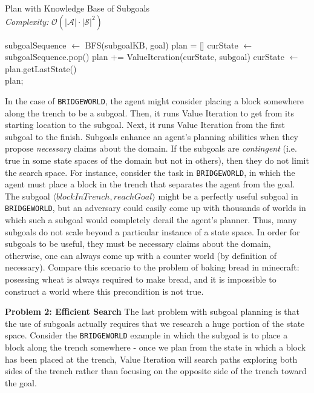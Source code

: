 \documentclass[]{article}
\begin{document}
\begin{algorithm}
  \caption{Plan with Knowledge Base of Subgoals \\ {\it Complexity:} $\mathcal{O}(|\mathcal{A}|\cdot |\mathcal{S}|^2)$}
  \begin{algorithmic}[1]
    \State subgoalSequence $\gets$ BFS(subgoalKB, goal)
    \State plan = []
    \State curState $\gets$ subgoalSequence.pop()
    		\State plan += ValueIteration(curState, subgoal)
		\State curState $\gets$ plan.getLastState()
    \EndFor \\
    \Return plan;
  \end{algorithmic}
\end{algorithm}

In the case of \texttt{BRIDGEWORLD}, the agent might consider placing
a block somewhere along the trench to be a subgoal. Then, it runs
Value Iteration to get from its starting location to the subgoal.
Next, it runs Value Iteration from the first subgoal to the finish.
Subgoals enhance an agent's planning abilities when they propose {\it
  necessary} claims about the domain. If the subgoals are {\it
  contingent} (i.e. true in some state spaces of the domain but not in
others), then they do not limit the search space. For instance,
consider the task in \texttt{BRIDGEWORLD}, in which the agent must
place a block in the trench that separates the agent from the goal.
The subgoal $\langle blockInTrench, reachGoal\rangle$ might be a
perfectly useful subgoal in \texttt{BRIDGEWORLD}, but an adversary
could easily come up with thousands of worlds in which such a subgoal
would completely derail the agent's planner. Thus, many subgoals do
not scale beyond a particular instance of a state space. In order for
subgoals to be useful, they must be necessary claims about the domain,
otherwise, one can always come up with a counter world (by definition
of necessary).  Compare this scenario to the problem of baking bread
in minecraft: posessing wheat is always required to make bread, and it
is impossible to construct a world where this precondition is not
true.

{\bf Problem 2: Efficient Search} The last problem with subgoal
planning is that the use of subgoals actually requires that we
research a huge portion of the state space. Consider the
\texttt{BRIDGEWORLD} example in which the subgoal is to place a block
along the trench somewhere - once we plan from the state in which a
block has been placed at the trench, Value Iteration will search paths
exploring both sides of the trench rather than focusing on the
opposite side of the trench toward the goal.
\end{document}
